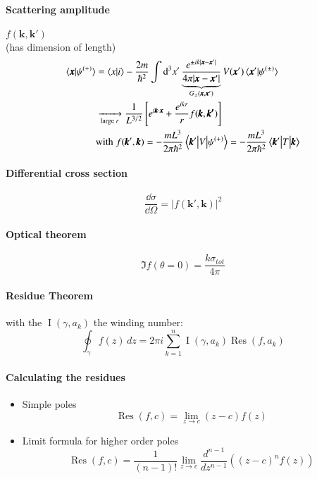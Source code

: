 \paragraph{Scattering amplitude} $f(\pmb{k},\pmb{k'})$ \\
(has dimension of length)
\begin{align}
	\begin{split}
		\braket{\pmb{x} | \psi^{(+)}} & = \braket{x | i} - \frac{2m}{\hbar^2}\int\dd^3 x' \underbrace{\frac{e^{\pm ik|\pmb{x}-\pmb{x}'|}}{4\pi |\pmb{x}-\pmb{x}'|}}_{G_{\pm}(\pmb{x}, \pmb{x}')}V(\pmb{x}')\braket{\pmb{x}' | \psi^{(\pm)}} \\
								  &\xrightarrow[\text{large }r]{} \frac{1}{L^{3/2}} \left[ e^{i \pmb{k} \cdot \pmb{x}} + \frac{e^{ikr}}{r} f(\pmb{k}, \pmb{k'}) \right] \\
								  &\text{with}\;	f(\pmb{k}', \pmb{k}) = -\frac{mL^3}{2\pi\hbar^2} \mel**{\pmb{k}'}{V}{\psi^{(+)}} = - \frac{mL^3}{2 \pi \hbar^2} \matrixel**{\pmb{k}'}{T}{\pmb{k}}
\end{split}
\end{align}
\paragraph{Differential cross section}
\begin{equation}
	\frac{\dd \sigma}{\dd \Omega} = |f(\pmb{k}', \pmb{k})|^2
\end{equation}

\paragraph{Optical theorem}
\begin{equation}
	\Im f(\theta=0) = \frac{k \sigma_{tot}}{4\pi}
\end{equation}

\paragraph{Residue Theorem} with the $\operatorname{I}(\gamma, a_k)$ the winding number:
\begin{equation}
\oint_\gamma f(z)\, dz = 2\pi i \sum_{k=1}^n \operatorname{I}(\gamma, a_k) \operatorname{Res}( f, a_k )
\end{equation}
\paragraph{Calculating the residues}
\begin{itemize}
\item Simple poles
	\begin{equation}
		\operatorname{Res}(f,c)=\lim_{z\to c}(z-c)f(z)
	\end{equation}
\item Limit formula for higher order poles
	\begin{equation}
		\operatorname{Res}(f,c) = \frac{1}{(n-1)!} \lim_{z \to c} \frac{d^{n-1}}{dz^{n-1}} \left( (z-c)^n f(z) \right)
	\end{equation}
\end{itemize}
